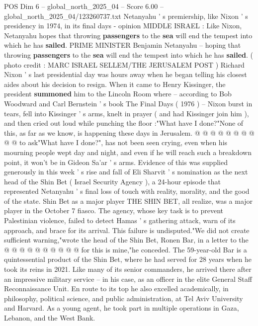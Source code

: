 \begin{textsample}{POS Dim 6 – global\_north\_2025\_04 – Score 6.00 – global\_north\_2025\_04/123260737.txt}  \label{ex:f6_pos_192}
Netanyahu ' s premiership, like Nixon ' s presidency in 1974, in its final days - opinion MIDDLE ISRAEL : Like Nixon, Netanyahu hopes that throwing \textbf{passengers} to the \textbf{sea} will end the tempest into which he has \textbf{sailed}.
PRIME MINISTER Benjamin Netanyahu -- hoping that throwing \textbf{passengers} to the \textbf{sea} will end the tempest into which he has \textbf{sailed}. ( photo credit : MARC ISRAEL SELLEM/THE JERUSALEM POST ) Richard Nixon ' s last presidential day was hours away when he began telling his closest aides about his decision to resign.
When it came to Henry Kissinger, the president \textbf{summoned} him to the Lincoln Room where -- according to Bob Woodward and Carl Bernstein ' s book The Final Days ( 1976 ) -- Nixon burst in tears, fell into Kissinger ' s arms, knelt in prayer ( and had Kissinger join him ), and then cried out loud while punching the floor :"What have I done?"None of this, as far as we know, is happening these days in Jerusalem. @ @ @ @ @ @ @ @ @ @ to ask"What have I done?", has not been seen crying, even when his mourning people wept day and night, and even if he will reach such a breakdown point, it won't be in Gideon Sa'ar ' s arms.
Evidence of this was supplied generously in this week ' s rise and fall of Eli Sharvit ' s nomination as the next head of the Shin Bet ( Israel Security Agency ), a 24-hour episode that represented Netanyahu ' s final loss of touch with reality, morality, and the good of the state.
Shin Bet as a major player THE SHIN BET, all realize, was a major player in the October 7 fiasco.
The agency, whose key task is to prevent Palestinian violence, failed to detect Hamas ' s gathering attack, warn of its approach, and brace for its arrival.
This failure is undisputed."We did not create sufficient warning,"wrote the head of the Shin Bet, Ronen Bar, in a letter to the @ @ @ @ @ @ @ @ @ @ for this is mine,"he conceded.
The 59-year-old Bar is a quintessential product of the Shin Bet, where he had served for 28 years when he took its reins in 2021.
Like many of its senior commanders, he arrived there after an impressive military service -- in his case, as an officer in the elite General Staff Reconnaissance Unit.
En route to its top he also excelled academically, in philosophy, political science, and public administration, at Tel Aviv University and Harvard.
As a young agent, he took part in multiple operations in Gaza, Lebanon, and the West Bank.

\end{textsample}
